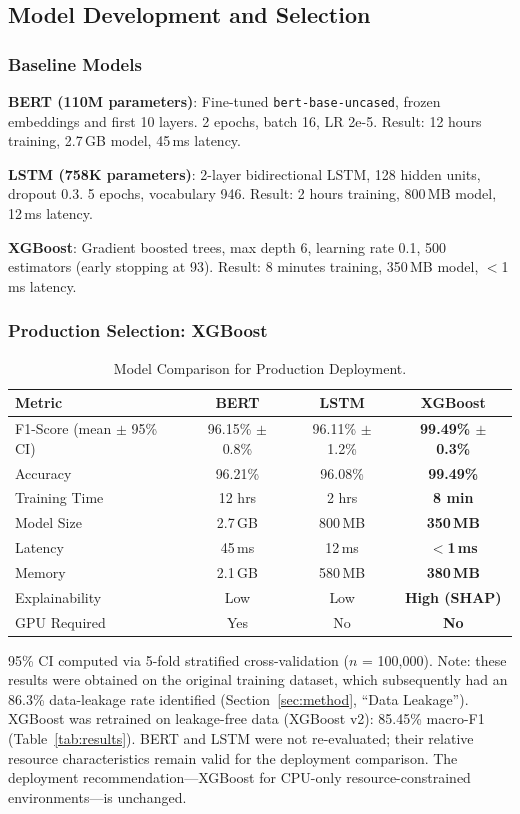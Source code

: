 \documentclass[futureinternet,article,submit,pdftex,moreauthors]{Definitions/mdpi}
\begin{document}
\subsection{Model Development and Selection}

\subsubsection{Baseline Models}

\textbf{BERT (110M parameters)}: Fine-tuned \texttt{bert-base-uncased}, frozen embeddings
and first 10 layers. 2 epochs, batch 16, LR 2e-5. Result: 12 hours training, 2.7\,GB model,
45\,ms latency.

\textbf{LSTM (758K parameters)}: 2-layer bidirectional LSTM, 128 hidden units, dropout 0.3.
5 epochs, vocabulary 946. Result: 2 hours training, 800\,MB model, 12\,ms latency.

\textbf{XGBoost}: Gradient boosted trees, max depth 6, learning rate 0.1, 500 estimators
(early stopping at 93). Result: 8 minutes training, 350\,MB model, ${<}$1\,ms latency.

\subsubsection{Production Selection: XGBoost}

\begin{table}[H]
\caption{Model Comparison for Production Deployment.\label{tab:model_comparison}}
\begin{tabularx}{\textwidth}{lCCC}
\toprule
\textbf{Metric} & \textbf{BERT} & \textbf{LSTM} & \textbf{XGBoost} \\
\midrule
F1-Score (mean $\pm$ 95\% CI) & 96.15\% $\pm$ 0.8\% & 96.11\% $\pm$ 1.2\% & \textbf{99.49\% $\pm$ 0.3\%} \\
Accuracy & 96.21\% & 96.08\% & \textbf{99.49\%} \\
\midrule
Training Time & 12 hrs & 2 hrs & \textbf{8 min} \\
Model Size & 2.7\,GB & 800\,MB & \textbf{350\,MB} \\
Latency & 45\,ms & 12\,ms & \textbf{${<}$1\,ms} \\
Memory & 2.1\,GB & 580\,MB & \textbf{380\,MB} \\
Explainability & Low & Low & \textbf{High (SHAP)} \\
GPU Required & Yes & No & \textbf{No} \\
\bottomrule
\end{tabularx}
{\footnotesize 95\% CI computed via 5-fold stratified cross-validation ($n$ = 100{,}000).
Note: these results were obtained on the original training dataset, which subsequently had
an 86.3\% data-leakage rate identified (Section~\ref{sec:method}, ``Data Leakage'').
XGBoost was retrained on leakage-free data (XGBoost v2): 85.45\% macro-F1 (Table~\ref{tab:results}).
BERT and LSTM were not re-evaluated; their relative resource characteristics remain valid
for the deployment comparison. The deployment recommendation---XGBoost for CPU-only
resource-constrained environments---is unchanged.}
\end{table}
\end{document}
